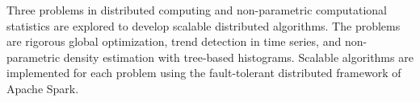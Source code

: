 \documentclass[main.tex]{subfiles}
\begin{document}
  Three problems in distributed computing and non-parametric computational statistics are
  explored to develop scalable distributed algorithms.
  The problems are rigorous global optimization, trend detection in time series, and
  non-parametric density estimation with tree-based histograms.
  Scalable algorithms are implemented for each problem using
  the fault-tolerant distributed framework of Apache Spark.
\end{document}

